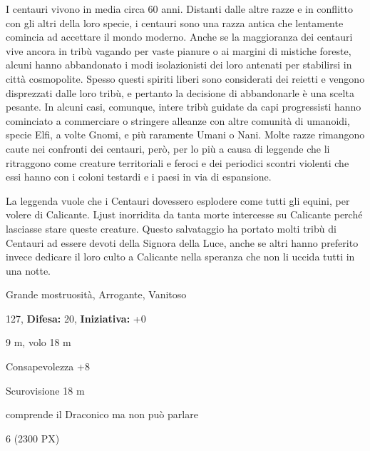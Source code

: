\begin{multicols}{2}
{I centauri vivono in media circa 60 anni. Distanti dalle altre razze e in conflitto con gli altri della loro specie, i centauri sono una razza antica che lentamente comincia ad accettare il mondo moderno. Anche se la maggioranza dei centauri vive ancora in tribù vagando per vaste pianure o ai margini di mistiche foreste, alcuni hanno abbandonato i modi isolazionisti dei loro antenati per stabilirsi in città cosmopolite. Spesso questi spiriti liberi sono considerati dei reietti e vengono disprezzati dalle loro tribù, e pertanto la decisione di abbandonarle è una scelta pesante. In alcuni casi, comunque, intere tribù guidate da capi progressisti hanno cominciato a commerciare o stringere alleanze con altre comunità di umanoidi, specie Elfi, a volte Gnomi, e più raramente Umani o Nani. Molte razze rimangono caute nei confronti dei centauri, però, per lo più a causa di leggende che li ritraggono come creature territoriali e feroci e dei periodici scontri violenti che essi hanno con i coloni testardi e i paesi in via di espansione.

La leggenda vuole che i Centauri dovessero esplodere come tutti gli equini, per volere di Calicante. Ljust inorridita da tanta morte intercesse su Calicante perché lasciasse stare queste creature. Questo salvataggio ha portato molti tribù di Centauri ad essere devoti della Signora della Luce, anche se altri hanno preferito invece dedicare il loro culto a Calicante nella speranza che non li uccida tutti in una notte.

\noindent
\begin{description}[noitemsep, topsep=0pt, parsep=0pt, partopsep=0pt, leftmargin=0cm, labelwidth=2.2cm]
	\item[\textbf{Taglia/Tipo:}] Grande mostruosità, Arrogante, Vanitoso
	\item[\textbf{Caratt.:}] 
	\item[\textbf{Punti Ferita:}] 127,  \textbf{Difesa:} 20,  \textbf{Iniziativa:} +0
	\item[\textbf{Movimento:}] 9 m, volo 18 m
	\item[\textbf{Tiri Salvez.:}] 
	\item[\textbf{Comp.:}] Consapevolezza +8
	\item[\textbf{Sensi:}] Scurovisione 18 m
	\item[\textbf{Linguaggi:}] comprende il Draconico ma non può parlare
	\item[\textbf{Sfida:}] 6 (2300 PX)\smallskip
\end{description}

}
\end{multicols}
